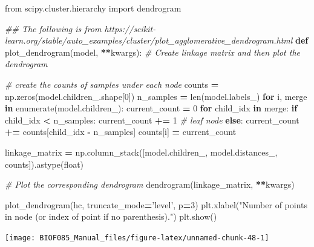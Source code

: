 \documentclass[
  letterpaper,
]{scrbook}
\newenvironment{Shaded}{\begin{snugshade}}{\end{snugshade}}
\newcommand{\BuiltInTok}[1]{#1}
\newcommand{\CommentTok}[1]{\textcolor[rgb]{0.56,0.35,0.01}{\textit{#1}}}
\newcommand{\ControlFlowTok}[1]{\textcolor[rgb]{0.13,0.29,0.53}{\textbf{#1}}}
\newcommand{\DecValTok}[1]{\textcolor[rgb]{0.00,0.00,0.81}{#1}}
\newcommand{\ImportTok}[1]{#1}
\newcommand{\KeywordTok}[1]{\textcolor[rgb]{0.13,0.29,0.53}{\textbf{#1}}}
\newcommand{\NormalTok}[1]{#1}
\newcommand{\OperatorTok}[1]{\textcolor[rgb]{0.81,0.36,0.00}{\textbf{#1}}}
\newcommand{\StringTok}[1]{\textcolor[rgb]{0.31,0.60,0.02}{#1}}
\begin{document}
\begin{Shaded}
\begin{Highlighting}[]
\ImportTok{from}\NormalTok{ scipy.cluster.hierarchy }\ImportTok{import}\NormalTok{ dendrogram}

\CommentTok{## The following is from https://scikit-learn.org/stable/auto_examples/cluster/plot_agglomerative_dendrogram.html}
\KeywordTok{def}\NormalTok{ plot_dendrogram(model, }\OperatorTok{**}\NormalTok{kwargs):}
    \CommentTok{# Create linkage matrix and then plot the dendrogram}

    \CommentTok{# create the counts of samples under each node}
\NormalTok{    counts }\OperatorTok{=}\NormalTok{ np.zeros(model.children_.shape[}\DecValTok{0}\NormalTok{])}
\NormalTok{    n_samples }\OperatorTok{=} \BuiltInTok{len}\NormalTok{(model.labels_)}
    \ControlFlowTok{for}\NormalTok{ i, merge }\KeywordTok{in} \BuiltInTok{enumerate}\NormalTok{(model.children_):}
\NormalTok{        current_count }\OperatorTok{=} \DecValTok{0}
        \ControlFlowTok{for}\NormalTok{ child_idx }\KeywordTok{in}\NormalTok{ merge:}
            \ControlFlowTok{if}\NormalTok{ child_idx }\OperatorTok{<}\NormalTok{ n_samples:}
\NormalTok{                current_count }\OperatorTok{+=} \DecValTok{1}  \CommentTok{# leaf node}
            \ControlFlowTok{else}\NormalTok{:}
\NormalTok{                current_count }\OperatorTok{+=}\NormalTok{ counts[child_idx }\OperatorTok{-}\NormalTok{ n_samples]}
\NormalTok{        counts[i] }\OperatorTok{=}\NormalTok{ current_count}

\NormalTok{    linkage_matrix }\OperatorTok{=}\NormalTok{ np.column_stack([model.children_, model.distances_,}
\NormalTok{                                      counts]).astype(}\BuiltInTok{float}\NormalTok{)}

    \CommentTok{# Plot the corresponding dendrogram}
\NormalTok{    dendrogram(linkage_matrix, }\OperatorTok{**}\NormalTok{kwargs)}

\NormalTok{plot_dendrogram(hc, truncate_mode}\OperatorTok{=}\StringTok{'level'}\NormalTok{, p}\OperatorTok{=}\DecValTok{3}\NormalTok{)}
\NormalTok{plt.xlabel(}\StringTok{"Number of points in node (or index of point if no parenthesis)."}\NormalTok{)}
\NormalTok{plt.show()}
\end{Highlighting}
\end{Shaded}

\begin{center}\texttt{[image: BIOF085\_Manual\_files/figure-latex/unnamed-chunk-48-1]} \end{center}
\end{document}
